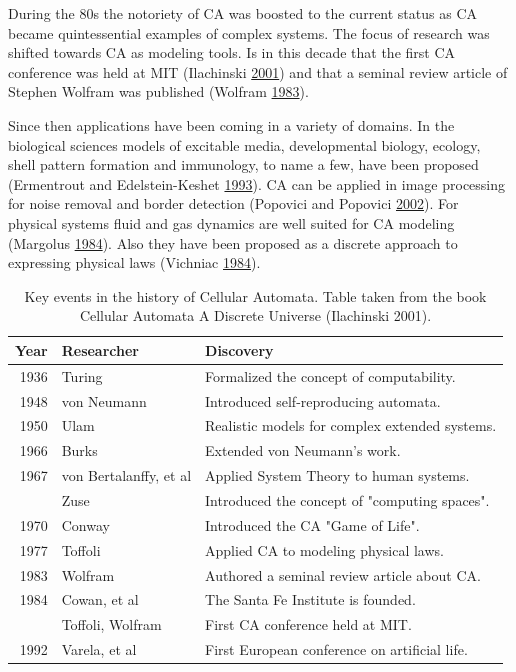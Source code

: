 \documentclass[
]{book}
\begin{document}
During the 80s the notoriety of CA was boosted to the current status as CA became quintessential examples of complex systems. The focus of research was shifted towards CA as modeling tools. Is in this decade that the first CA conference was held at MIT (Ilachinski \protect\hyperlink{ref-ilachinski2001cellular}{2001}) and that a seminal review article of Stephen Wolfram was published (Wolfram \protect\hyperlink{ref-wolfram1983statistical}{1983}).

Since then applications have been coming in a variety of domains. In the biological sciences models of excitable media, developmental biology, ecology, shell pattern formation and immunology, to name a few, have been proposed (Ermentrout and Edelstein-Keshet \protect\hyperlink{ref-ermentrout1993cellular}{1993}). CA can be applied in image processing for noise removal and border detection (Popovici and Popovici \protect\hyperlink{ref-popovici2002cellular}{2002}). For physical systems fluid and gas dynamics are well suited for CA modeling (Margolus \protect\hyperlink{ref-margolus1984physics}{1984}). Also they have been proposed as a discrete approach to expressing physical laws (Vichniac \protect\hyperlink{ref-vichniac1984simulating}{1984}).

\begin{table}

\caption{\label{tab:key-events}Key events in the history of Cellular Automata. Table taken from the book Cellular Automata A Discrete Universe (Ilachinski 2001).}
\centering
\begin{tabular}[t]{rll}
\toprule
Year & Researcher & Discovery\\
\midrule
1936 & Turing & Formalized the concept of computability.\\
1948 & von Neumann & Introduced self-reproducing automata.\\
1950 & Ulam & Realistic models for complex extended systems.\\
1966 & Burks & Extended von Neumann's work.\\
1967 & von Bertalanffy, et al & Applied System Theory to human systems.\\
\addlinespace
1969 & Zuse & Introduced the concept of "computing spaces".\\
1970 & Conway & Introduced the CA "Game of Life".\\
1977 & Toffoli & Applied CA to modeling physical laws.\\
1983 & Wolfram & Authored a seminal review article about CA.\\
1984 & Cowan, et al & The Santa Fe Institute is founded.\\
\addlinespace
1987 & Toffoli, Wolfram & First CA conference held at MIT.\\
1992 & Varela, et al & First European conference on artificial life.\\
\bottomrule
\end{tabular}
\end{table}
\end{document}
